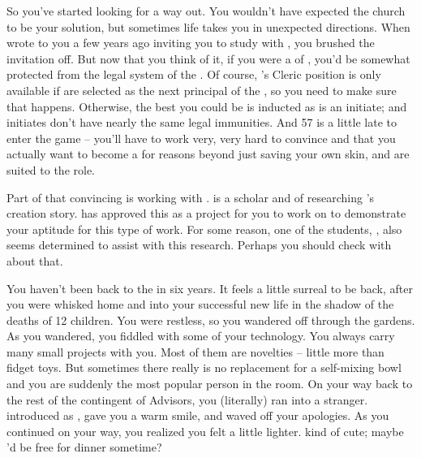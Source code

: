 \documentclass[char]{GL2020}
\begin{document}
So you've started looking for a way out. You wouldn't have expected the church to be your solution, but sometimes life takes you in unexpected directions. When \cBeetle{\full} wrote to you a few years ago inviting you to study with \cBeetle{\them}, you brushed the invitation off. But now that you think of it, if you were a \cHeadScientist{\cleric} of \cTechGod{}, you'd be somewhat protected from the legal system of the \pTech{}. Of course, \cBeetle{}'s Cleric position is only available if \cBeetle{\they} are selected as the next principal of the \pSc{}, so you need to make sure that happens. Otherwise, the best you could be is inducted as is an initiate; and initiates don't have nearly the same legal immunities. And 57 is a little late to enter the game -- you'll have to work very, very hard to convince \cAntiChup{\full} and \cBeetle{} that you actually want to become a \cHeadScientist{\cleric} for reasons beyond just saving your own skin, and are suited to the role.

Part of that convincing is working with \cEbbPriest{\full}. \cEbbPriest{} is a scholar and \pShip{} \cEbbPriest{\cleric} of \cEbb{} researching \pEarth{}'s creation story. \cBeetle{} has approved this as a project for you to work on to demonstrate your aptitude for this type of work. For some reason, one of the students, \cScholarship{\full}, also seems determined to assist with this research. Perhaps you should check with \cBeetle{} about that.

You haven't been back to the \pSc{} in six years. It feels a little surreal to be back, after you were whisked home and into your successful new life in the shadow of the deaths of 12 children. You were restless, so you wandered off through the gardens. As you wandered, you fiddled with some of your technology. You always carry many small projects with you. Most of them are novelties -- little more than fidget toys. But sometimes there really is no replacement for a self-mixing bowl and you are suddenly the most popular person in the room. On your way back to the rest of the \pTech{} contingent of Advisors, you (literally) ran into a stranger. \cChupAvenger{\They} introduced \cChupAvenger{\themself} as \cChupAvenger{\full}, gave you a warm smile, and waved off your apologies. As you continued on your way, you realized you felt a little lighter. \cChupAvenger{\Theyare} kind of cute; maybe \cChupAvenger{\they}'d be free for dinner sometime?
\end{document}
